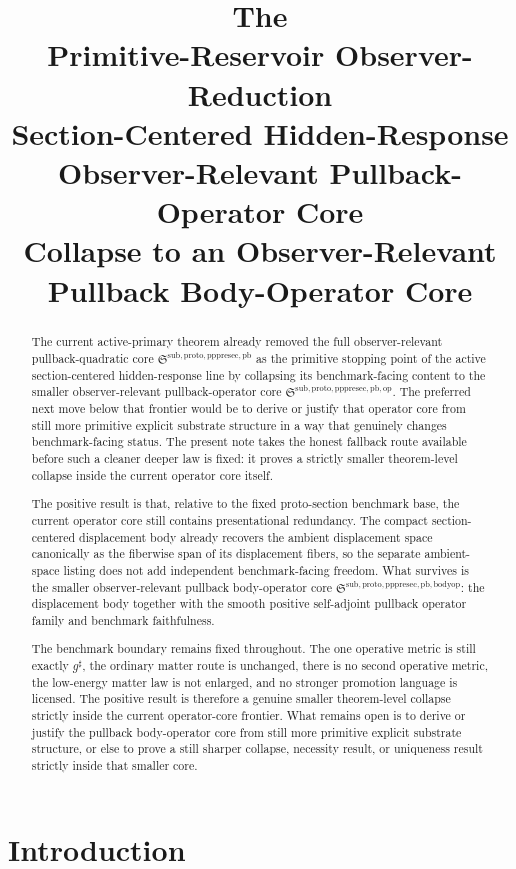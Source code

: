 \documentclass[11pt]{article}
\title{\textbf{The \TheoryName{}}\\[0.4em]
\large Primitive-Reservoir Observer-Reduction\\
\large Section-Centered Hidden-Response\\
\large Observer-Relevant Pullback-Operator Core\\
\large Collapse to an Observer-Relevant Pullback Body-Operator Core}
\author{}
\date{}
\newcommand{\CompletedMetric}{g^{\sharp}}
\newcommand{\PrePreProtoSectionPullbackCore}{\mathfrak S^{\mathrm{sub,proto,pppresec,pb}}}
\newcommand{\PullbackOperatorCore}{\mathfrak S^{\mathrm{sub,proto,pppresec,pb,op}}}
\newcommand{\PullbackBodyOperatorCore}{\mathfrak S^{\mathrm{sub,proto,pppresec,pb,bodyop}}}
\begin{document}
\maketitle

\begin{abstract}
The current active-primary theorem already removed the full observer-relevant pullback-quadratic core \(\PrePreProtoSectionPullbackCore\) as the primitive stopping point of the active section-centered hidden-response line by collapsing its benchmark-facing content to the smaller observer-relevant pullback-operator core \(\PullbackOperatorCore\). The preferred next move below that frontier would be to derive or justify that operator core from still more primitive explicit substrate structure in a way that genuinely changes benchmark-facing status. The present note takes the honest fallback route available before such a cleaner deeper law is fixed: it proves a strictly smaller theorem-level collapse inside the current operator core itself.

The positive result is that, relative to the fixed proto-section benchmark base, the current operator core still contains presentational redundancy. The compact section-centered displacement body already recovers the ambient displacement space canonically as the fiberwise span of its displacement fibers, so the separate ambient-space listing does not add independent benchmark-facing freedom. What survives is the smaller observer-relevant pullback body-operator core \(\PullbackBodyOperatorCore\): the displacement body together with the smooth positive self-adjoint pullback operator family and benchmark faithfulness.

The benchmark boundary remains fixed throughout. The one operative metric is still exactly \(\CompletedMetric\), the ordinary matter route is unchanged, there is no second operative metric, the low-energy matter law is not enlarged, and no stronger promotion language is licensed. The positive result is therefore a genuine smaller theorem-level collapse strictly inside the current operator-core frontier. What remains open is to derive or justify the pullback body-operator core from still more primitive explicit substrate structure, or else to prove a still sharper collapse, necessity result, or uniqueness result strictly inside that smaller core.
\end{abstract}

\section{Introduction}
\end{document}
